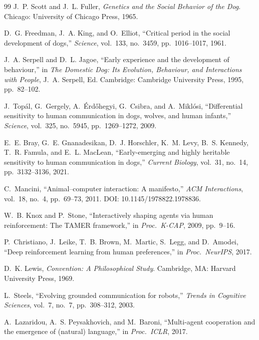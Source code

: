 \begin{thebibliography}{99}
J.~P. Scott and J.~L. Fuller, \emph{Genetics and the Social Behavior of the
Dog}. Chicago: University of Chicago Press, 1965.

D.~G. Freedman, J.~A. King, and O.~Elliot, ``Critical period in the social
development of dogs,'' \emph{Science}, vol.~133, no.~3459, pp.~1016--1017, 1961.

J.~A. Serpell and D.~L. Jagoe, ``Early experience and the development of
behaviour,'' in \emph{The Domestic Dog: Its Evolution, Behaviour, and
Interactions with People}, J.~A. Serpell, Ed. Cambridge: Cambridge
University Press, 1995, pp.~82--102.

J.~Top\'al, G.~Gergely, A.~\'Erd\H{o}hegyi, G.~Csibra, and A.~Mikl\'osi,
``Differential sensitivity to human communication in dogs, wolves, and human
infants,'' \emph{Science}, vol.~325, no.~5945, pp.~1269--1272, 2009.

E.~E. Bray, G.~E. Gnanadesikan, D.~J. Horschler, K.~M. Levy, B.~S. Kennedy,
T.~R. Famula, and E.~L. MacLean, ``Early-emerging and highly heritable
sensitivity to human communication in dogs,'' \emph{Current Biology},
vol.~31, no.~14, pp.~3132--3136, 2021.

C.~Mancini, ``Animal--computer interaction: A manifesto,'' \emph{ACM
Interactions}, vol.~18, no.~4, pp.~69--73, 2011. DOI: 10.1145/1978822.1978836.

W.~B. Knox and P.~Stone, ``Interactively shaping agents via human
reinforcement: The TAMER framework,'' in \emph{Proc.\ K-CAP}, 2009, pp.~9--16.

P.~Christiano, J.~Leike, T.~B. Brown, M.~Martic, S.~Legg, and D.~Amodei,
``Deep reinforcement learning from human preferences,'' in \emph{Proc.\
NeurIPS}, 2017.

D.~K. Lewis, \emph{Convention: A Philosophical Study}. Cambridge, MA:
Harvard University Press, 1969.

L.~Steels, ``Evolving grounded communication for robots,'' \emph{Trends in
Cognitive Sciences}, vol.~7, no.~7, pp.~308--312, 2003.

A.~Lazaridou, A.~S. Peysakhovich, and M.~Baroni, ``Multi-agent cooperation
and the emergence of (natural) language,'' in \emph{Proc.\ ICLR}, 2017.


\end{thebibliography}

